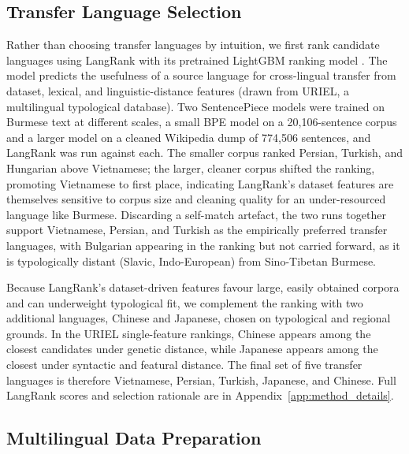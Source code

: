\documentclass[11pt]{article}
\begin{document}
\subsection{Transfer Language Selection}
\label{sec:transfer_selection}

Rather than choosing transfer languages by intuition, we first rank candidate languages using LangRank \citep{lin-etal-2019-choosing} with its pretrained LightGBM ranking model \citep{ke2017lightgbm}. The model predicts the usefulness of a source language for cross-lingual transfer from dataset, lexical, and linguistic-distance features (drawn from URIEL, a multilingual
typological database). Two SentencePiece models were trained on Burmese text at different scales, a small BPE model on a 20{,}106-sentence corpus and a larger model on a cleaned Wikipedia dump of 774{,}506 sentences, and LangRank was run against each. The smaller corpus ranked Persian, Turkish, and Hungarian above Vietnamese; the larger, cleaner corpus shifted the ranking, promoting Vietnamese to first place, indicating LangRank's dataset features are themselves sensitive to corpus size and cleaning quality for an under-resourced language like Burmese. Discarding a self-match artefact, the two runs together support Vietnamese, Persian, and Turkish as the empirically preferred transfer languages, with Bulgarian appearing in the ranking but not carried forward, as it is typologically distant (Slavic, Indo-European) from Sino-Tibetan Burmese.

Because LangRank's dataset-driven features favour large, easily obtained corpora and can underweight typological fit, we complement the ranking with two additional languages, Chinese and Japanese, chosen on typological and regional grounds. In the URIEL single-feature rankings, Chinese
appears among the closest candidates under genetic distance, while Japanese
appears among the closest under syntactic and featural distance. The final set of five transfer languages is therefore Vietnamese, Persian, Turkish, Japanese, and Chinese. Full LangRank scores and selection rationale are in Appendix~\ref{app:method_details}.

\subsection{Multilingual Data Preparation}
\label{sec:data_prep}
\end{document}
